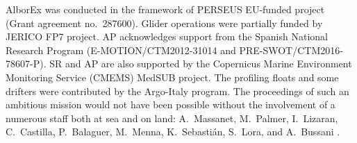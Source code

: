 \documentclass[essd]{copernicus}
\begin{document}



\begin{acknowledgements}
AlborEx was conducted in the framework of PERSEUS EU-funded project (Grant agreement no.~287600). Glider operations were partially funded by JERICO FP7 project. AP acknowledges support from the Spanish National Research Program (E-MOTION/CTM2012-31014 and PRE-SWOT/CTM2016-78607-P). SR and AP are also supported by the Copernicus Marine Environment Monitoring Service (CMEMS) MedSUB project. The profiling floats and some drifters were contributed by the Argo-Italy program. The proceedings of such an ambitious mission would not have been possible without the involvement of a numerous staff both at sea and on land: A.~Massanet, M.~Palmer, I.~Lizaran, C.~Castilla, P.~Balaguer, M.~Menna, K.~Sebastián, S.~Lora, and A.~Bussani .


\end{acknowledgements}

\newpage



\end{document}
